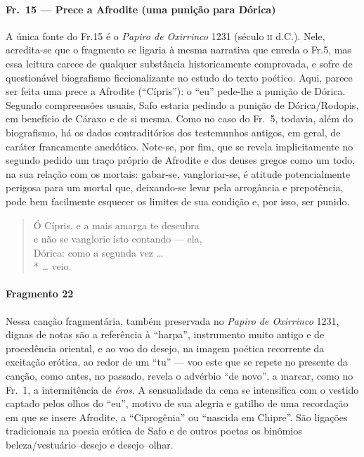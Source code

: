 \paragraph{Fr.~15 --- Prece a Afrodite (uma punição para Dórica)}

{\small A única fonte do Fr.15 é o \textit{Papiro de Oxirrinco} 1231 (século \textsc{ii} d.C.).
Nele, acredita-se que o fragmento se ligaria à mesma narrativa que enreda o Fr.5, mas essa
leitura carece de qualquer substância historicamente comprovada, e sofre de
questionável biografismo ficcionalizante no estudo do texto poético. Aqui,
parece ser feita uma prece a Afrodite (“Cípris”): o “eu” pede-lhe a
punição de Dórica. Segundo compreensões usuais, Safo estaria pedindo a punição
de Dórica/Rodopis, em benefício de Cáraxo e de si mesma. Como no caso do Fr.~5,
todavia, além do biografismo, há os dados contraditórios dos testemunhos
antigos, em geral, de caráter francamente anedótico. Note-se, por fim, que se
revela implicitamente no segundo pedido um traço próprio de Afrodite e dos
deuses gregos como um todo, na sua relação com os mortais: gabar-se,
vangloriar-se, é atitude potencialmente perigosa para um mortal que,
deixando-se levar pela arrogância e prepotência, pode bem facilmente esquecer
os limites de sua condição e, por isso, ser punido.}

\begin{verse}
Ó Cípris, e a mais amarga te descubra\\
e não se vanglorie isto contando --- ela,\\
Dórica: como a segunda vez \ldots{}\\*
\ldots{} veio.
\end{verse}


\paragraph{Fragmento 22}

{\small Nessa canção fragmentária, também preservada no \textit{Papiro de Oxirrinco}
1231, dignas de notas são a referência à ``harpa'', instrumento muito
antigo e de procedência oriental, e ao voo do desejo, na imagem poética
recorrente da excitação erótica, ao redor de um “tu” --- voo este que se repete
no presente da canção, como antes, no passado, revela o advérbio ``de
novo”, a marcar, como no Fr.~1, a intermitência de \textit{éros}. A
sensualidade da cena se intensifica com o vestido captado pelos olhos do “eu”,
motivo de sua alegria e gatilho de uma recordação em que se insere Afrodite, a
``Ciprogênia'' ou “nascida em Chipre”. São ligações tradicionais na
poesia erótica de Safo e de outros poetas os binômios beleza/vestuário--desejo e
desejo--olhar.}

